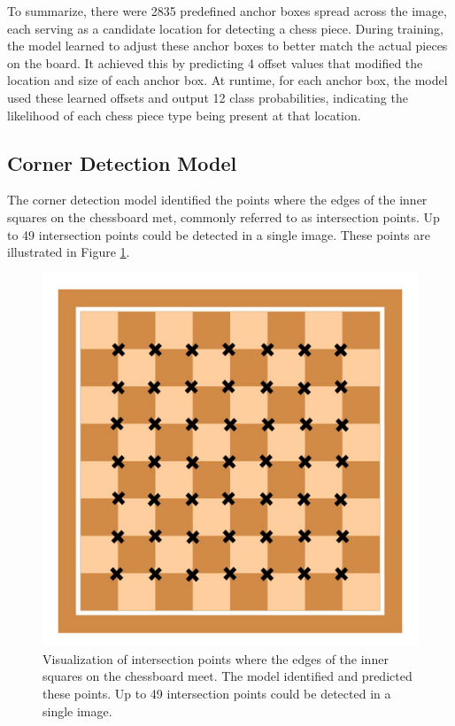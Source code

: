 \newpage

To summarize, there were 2835 predefined anchor boxes spread across the image, each serving as a candidate location for detecting a chess piece. During training, the model learned to adjust these anchor boxes to better match the actual pieces on the board. It achieved this by predicting 4 offset values that modified the location and size of each anchor box. At runtime, for each anchor box, the model used these learned offsets and output 12 class probabilities, indicating the likelihood of each chess piece type being present at that location.

\newpage

\subsection{Corner Detection Model}
The corner detection model identified the points where the edges of the inner squares on the chessboard met, commonly referred to as intersection points. Up to 49 intersection points could be detected in a single image. These points are illustrated in Figure \ref{fig:xcorners-chessboard}.

\begin{figure}[h!]
    \centering
    \includegraphics[width=0.75\linewidth]{figures/methods/ml-models/xcorners_chessboard.jpg}
    \caption[s]{Visualization of intersection points where the edges of the inner squares on the chessboard meet. The model identified and predicted these points. Up to 49 intersection points could be detected in a single image. \cite{vectorstock:chessboard-svg}}
    \label{fig:xcorners-chessboard}
\end{figure}

